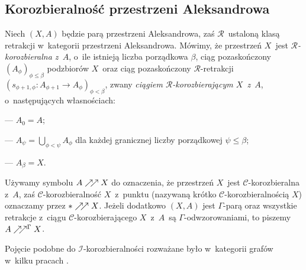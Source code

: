 \subsection{Korozbieralność przestrzeni Aleksandrowa}
Niech $(X,A)$ będzie parą przestrzeni Aleksandrowa, zaś $\mathcal{R}$~ustaloną klasą retrakcji w~kategorii przestrzeni Aleksandrowa. Mówimy, że przestrzeń $X$~jest \textit{\mbox{$\mathcal{R}$-korozbieralna} z~$A$}, o~ile istnieją liczba porządkowa $\beta$, ciąg pozaskończony $\left(A_\phi\right)_{\phi\leq\beta}$ podzbiorów $X$~oraz ciąg pozaskończony \mbox{$\mathcal{R}$-retrakcji} $\left(s_{\phi+1,\phi}\colon A_{\phi+1} \to A_{\phi}\right)_{\phi<\beta}$, zwany \textit{ciągiem \mbox{$\mathcal{R}$-korozbierającym} $X$~z~$A$}, o~następujących własnościach:
\begin{compactitem}
\item[---] $A_0=A$;
\item[---] $A_{\psi}=\bigcup_{\phi<\psi}A_{\phi}$ dla każdej granicznej liczby porządkowej $\psi\leq\beta$;
\item[---] $A_\beta=X$.
\end{compactitem}

Używamy symbolu $A\nearrow\!\!\nearrow X$ do oznaczenia, że przestrzeń $X$~jest \mbox{$\mathcal{C}$-korozbieralna} z~$A$, zaś \mbox{$\mathcal{C}$-korozbieralność} $X$~z~punktu (nazywaną krótko \mbox{$\mathcal{C}$-korozbieralnością} $X$) oznaczamy przez $*\nearrow\!\!\nearrow X$. Jeżeli dodatkowo $(X,A)$ jest $\Gamma$-parą oraz wszystkie retrakcje z~ciągu $\mathcal{C}$-korozbierającego $X$~z~$A$~są \mbox{$\Gamma$-odwzorowaniami}, to piszemy $A\nearrow\!\!\nearrow^\Gamma X$.

Pojęcie podobne do $\mathcal{I}$-korozbieralności rozważane było w~kategorii grafów w~kilku pracach \cite{Chastand00,Polat03,Polat03a}.

